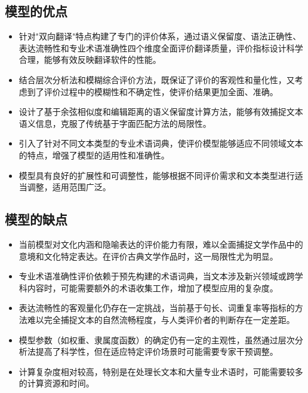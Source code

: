 \documentclass[bwprint]{cumcmthesis}
\begin{document}
\subsection{模型的优点}
\begin{itemize}[itemindent=2em]
\item 针对"双向翻译"特点构建了专门的评价体系，通过语义保留度、语法正确性、表达流畅性和专业术语准确性四个维度全面评价翻译质量，评价指标设计科学合理，能够有效反映翻译软件的性能。

\item 结合层次分析法和模糊综合评价方法，既保证了评价的客观性和量化性，又考虑到了评价过程中的模糊性和不确定性，使评价结果更加全面、准确。

\item 设计了基于余弦相似度和编辑距离的语义保留度计算方法，能够有效捕捉文本语义信息，克服了传统基于字面匹配方法的局限性。

\item 引入了针对不同文本类型的专业术语词典，使评价模型能够适应不同领域文本的特点，增强了模型的适用性和准确性。

\item 模型具有良好的扩展性和可调整性，能够根据不同评价需求和文本类型进行适当调整，适用范围广泛。
\end{itemize}

\subsection{模型的缺点}
\begin{itemize}[itemindent=2em]
\item 当前模型对文化内涵和隐喻表达的评价能力有限，难以全面捕捉文学作品中的意境和文化特定表达。在评价古典文学作品时，这一局限性尤为明显。

\item 专业术语准确性评价依赖于预先构建的术语词典，当文本涉及新兴领域或跨学科内容时，可能需要额外的术语收集工作，增加了模型应用的复杂度。

\item 表达流畅性的客观量化仍存在一定挑战，当前基于句长、词重复率等指标的方法难以完全捕捉文本的自然流畅程度，与人类评价者的判断存在一定差距。

\item 模型参数（如权重、隶属度函数）的确定仍有一定的主观性，虽然通过层次分析法提高了科学性，但在适应特定评价场景时可能需要专家干预调整。

\item 计算复杂度相对较高，特别是在处理长文本和大量专业术语时，可能需要较多的计算资源和时间。
\end{itemize}
\end{document}
